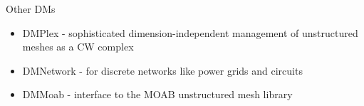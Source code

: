 
\begin{frame}{Other DMs}
  \begin{itemize}
  \item DMPlex - sophisticated dimension-independent management of unstructured meshes as a CW complex
  \item DMNetwork - for discrete networks like power grids and circuits
  \item DMMoab - interface to the MOAB unstructured mesh library
  \end{itemize}
\end{frame}
